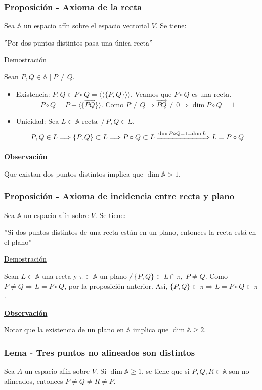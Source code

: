 \documentclass[12pt, a4paper, ones, notitlepage, openany,titlepage]{article}
\newcommand{\demostracion}{\noindent\underline{Demostración}}
\newcommand{\observacion}{\noindent\underline{\textbf{Observación}}}
\begin{document}
\subsubsection{Proposición - Axioma de la recta}
\noindent Sea $\mathbb{A}$ un espacio afín sobre el espacio vectorial $V$. Se tiene:
\begin{center}
	''Por dos puntos distintos pasa una única recta''
\end{center}

\demostracion

\noindent Sean $P, Q \in \mathbb{A} \mid P \neq Q$.
\begin{itemize}
	\item Existencia: $P, Q \in P \circ Q = \langle\langle \{P,Q\} \rangle\rangle$. Veamos que $P \circ Q$ es una recta.
	$$
	P \circ Q = P + \langle\{\overrightarrow{PQ}\}\rangle \text{. Como } P \neq Q \Longrightarrow \overrightarrow{PQ} \neq 0 \Longrightarrow \dim P \circ Q = 1
	$$
	\item Unicidad: Sea $L \subset \mathbb{A} \text{ recta } \,/\, P,Q \in L$.
	$$
	P,Q \in L \Longrightarrow \{P,Q\} \subset L \Longrightarrow P \circ Q \subset L \xRightarrow{\dim P \circ Q = 1 = \dim L} L = P \circ Q
	$$
\end{itemize}
\observacion

\noindent Que existan dos puntos distintos implica que $\dim \mathbb{A} > 1$.

\subsubsection{Proposición - Axioma de incidencia entre recta y plano}
\noindent Sea $\mathbb{A}$ un espacio afín sobre $V$. Se tiene:
\begin{center}
	''Si dos puntos distintos de una recta están en un plano, entonces la recta está en el plano''
\end{center}
\demostracion

Sean $L \subset \mathbb{A}$ una recta y $\pi \subset \mathbb{A}$ un plano $/\, \{P,Q\} \subset L \cap \pi, \; P \neq Q$. Como $P \neq Q \Longrightarrow L = P \circ Q$, por la proposición anterior. Así, $\{P,Q\} \subset \pi \Longrightarrow L = P \circ Q \subset \pi$.

\observacion

\noindent Notar que la existencia de un plano en $\mathbb{A}$ implica que $\dim \mathbb{A} \ge 2$.

\subsubsection{Lema - Tres puntos no alineados son distintos}
Sea $A$ un espacio afín sobre $V$. Si $\dim \mathbb{A} \ge 1$, se tiene que si $P,Q,R \in \mathbb{A}$ son no alineados, entonces $P \neq Q \neq R \neq P$.
\end{document}
